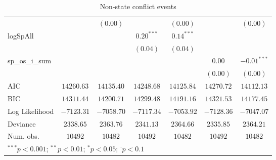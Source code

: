 \begin{sidewaystable}
\begin{center}
{\begin{tabular}{l c c c c c c}
                &               & $(0.00)$        &               & $(0.00)$      &               & $(0.00)$        \\
logSpAll        &               &                 & $0.20^{***}$  & $0.14^{***}$  &               &                 \\
                &               &                 & $(0.04)$      & $(0.04)$      &               &                 \\
sp\_os\_i\_sum  &               &                 &               &               & $0.00$        & $-0.01^{***}$   \\
                &               &                 &               &               & $(0.00)$      & $(0.00)$        \\
\hline
AIC             & $14260.63$    & $14135.40$      & $14248.68$    & $14125.84$    & $14270.72$    & $14112.13$      \\
BIC             & $14311.44$    & $14200.71$      & $14299.48$    & $14191.16$    & $14321.53$    & $14177.45$      \\
Log Likelihood  & $-7123.31$    & $-7058.70$      & $-7117.34$    & $-7053.92$    & $-7128.36$    & $-7047.07$      \\
Deviance        & $2338.65$     & $2363.76$       & $2341.13$     & $2364.66$     & $2335.85$     & $2364.21$       \\
Num. obs.       & $10492$       & $10482$         & $10492$       & $10482$       & $10492$       & $10482$         \\
\hline
\multicolumn{7}{l}{\scriptsize{$^{***}p<0.001$; $^{**}p<0.01$; $^{*}p<0.05$; $^{\cdot}p<0.1$}}
\end{tabular}
}
\caption{Non-state conflict events}
\label{non_state}
\end{center}
\end{sidewaystable}
